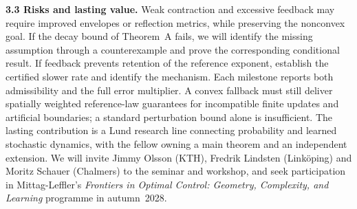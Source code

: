 \documentclass[12pt,a4paper]{article}
\begin{document}
\textbf{3.3 Risks and lasting value.}
Weak contraction and excessive feedback may require improved envelopes or reflection metrics, while preserving the nonconvex goal. If the decay bound of Theorem~A fails, we will identify the missing assumption through a counterexample and prove the corresponding conditional result. If feedback prevents retention of the reference exponent, establish the certified slower rate and identify the mechanism. Each milestone reports both admissibility and the full error multiplier. A convex fallback must still deliver spatially weighted reference-law guarantees for incompatible finite updates and artificial boundaries; a standard perturbation bound alone is insufficient. The lasting contribution is a Lund research line connecting probability and learned stochastic dynamics, with the fellow owning a main theorem and an independent extension. We will invite Jimmy Olsson (KTH), Fredrik Lindsten (Link\"oping) and Moritz Schauer (Chalmers) to the seminar and workshop, and seek participation in Mittag-Leffler's \emph{Frontiers in Optimal Control: Geometry, Complexity, and Learning} programme in autumn~2028.
\end{document}
